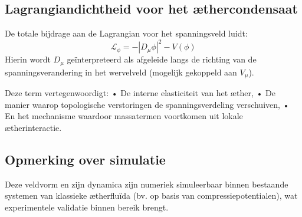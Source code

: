 \subsection*{Lagrangiandichtheid voor het æthercondensaat}
De totale bijdrage aan de Lagrangian voor het spanningsveld luidt:
\[
    \mathcal{L}_{\phi} = -|D_\mu \phi|^2 - V(\phi)
\]
Hierin wordt $D_\mu$ geïnterpreteerd als afgeleide langs de richting van de spanningsverandering in het wervelveld (mogelijk gekoppeld aan $V_\mu$).

Deze term vertegenwoordigt:\newline
• De interne elasticiteit van het æther,\newline
• De manier waarop topologische verstoringen de spanningsverdeling verschuiven,\newline
• En het mechanisme waardoor massatermen voortkomen uit lokale ætherinteractie.

\subsection*{Opmerking over simulatie}
Deze veldvorm en zijn dynamica zijn numeriek simuleerbaar binnen bestaande systemen van klassieke ætherfluïda (bv. op basis van compressiepotentialen), wat experimentele validatie binnen bereik brengt.